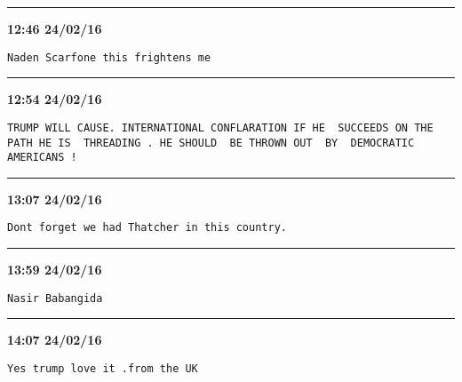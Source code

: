 \hrule%

\begin{adjustwidth}{0cm}{0cm}
\footnotesize \textbf{12:46 24/02/16}

\begin{lstlisting}[breaklines, breakatwhitespace, basicstyle=\small, frame=leftline]
Naden Scarfone this frightens me
\end{lstlisting}
\end{adjustwidth}

\hrule%

\begin{adjustwidth}{0cm}{0cm}
\footnotesize \textbf{12:54 24/02/16}

\begin{lstlisting}[breaklines, breakatwhitespace, basicstyle=\small, frame=leftline]
TRUMP WILL CAUSE. INTERNATIONAL CONFLARATION IF HE  SUCCEEDS ON THE PATH HE IS  THREADING . HE SHOULD  BE THROWN OUT  BY  DEMOCRATIC AMERICANS !
\end{lstlisting}
\end{adjustwidth}

\hrule%

\begin{adjustwidth}{0cm}{0cm}
\footnotesize \textbf{13:07 24/02/16}

\begin{lstlisting}[breaklines, breakatwhitespace, basicstyle=\small, frame=leftline]
Dont forget we had Thatcher in this country.
\end{lstlisting}
\end{adjustwidth}

\hrule%

\begin{adjustwidth}{0cm}{0cm}
\footnotesize \textbf{13:59 24/02/16}

\begin{lstlisting}[breaklines, breakatwhitespace, basicstyle=\small, frame=leftline]
Nasir Babangida
\end{lstlisting}
\end{adjustwidth}

\hrule%

\begin{adjustwidth}{0cm}{0cm}
\footnotesize \textbf{14:07 24/02/16}

\begin{lstlisting}[breaklines, breakatwhitespace, basicstyle=\small, frame=leftline]
Yes trump love it .from the UK
\end{lstlisting}
\end{adjustwidth}


